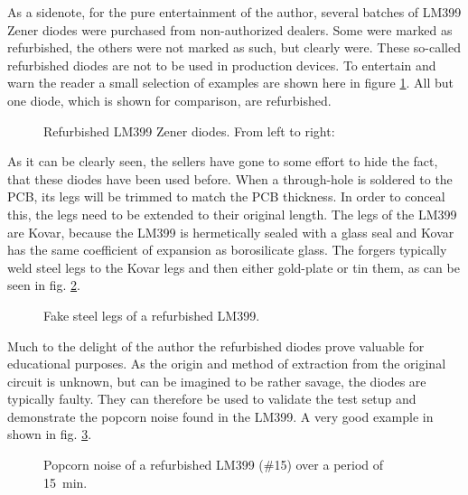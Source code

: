 As a sidenote, for the pure entertainment of the author, several batches of LM399 Zener diodes were purchased from non-authorized dealers. Some were marked as refurbished, the others were not marked as such, but clearly were. These so-called refurbished diodes are not to be used in production devices. To entertain and warn the reader a small selection of examples are shown here in figure \ref{fig:fake_lm399}. All but one diode, which is shown for comparison, are refurbished.

\begin{figure}[h]
    \centering
    \caption{Refurbished LM399 Zener diodes. From left to right: }
    \label{fig:fake_lm399}
\end{figure}

As it can be clearly seen, the sellers have gone to some effort to hide the fact, that these diodes have been used before. When a through-hole is soldered to the PCB, its legs will be trimmed to match the PCB thickness. In order to conceal this, the legs need to be extended to their original length. The legs of the LM399 are Kovar, because the LM399 is hermetically sealed with a glass seal and Kovar has the same coefficient of expansion as borosilicate glass. The forgers typically weld steel legs to the Kovar legs and then either gold-plate or tin them, as can be seen in fig. \ref{fig:fake_lm399_legs}.

\begin{figure}[h]
    \centering
    \caption{Fake steel legs of a refurbished LM399.}
    \label{fig:fake_lm399_legs}
\end{figure}

Much to the delight of the author the refurbished diodes prove valuable for educational purposes. As the origin and method of extraction from the original circuit is unknown, but can be imagined to be rather savage, the diodes are typically faulty. They can therefore be used to validate the test setup and demonstrate the popcorn noise found in the LM399. A very good example in shown in fig. \ref{fig:fake_lm399_popcorn_noise}.

\begin{figure}[h]
    \centering
    
    \caption{Popcorn noise of a refurbished LM399 (\#15) over a period of \qty{15}{\minute}.}
    \label{fig:fake_lm399_popcorn_noise}
\end{figure}

